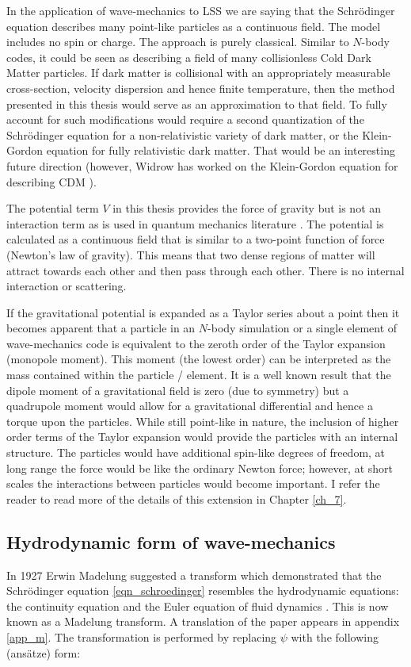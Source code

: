 In the application of wave-mechanics to LSS we are saying that the Schr\"odinger equation describes many point-like particles as a continuous field. The model includes no spin or charge. The approach is purely classical. Similar to $N$-body codes, it could be seen as describing a field of many collisionless Cold Dark Matter particles. If dark matter is collisional with an appropriately measurable cross-section, velocity dispersion and hence finite temperature, then the method presented in this thesis would serve as an approximation to that field. To fully account for such modifications would require a second quantization of the Schr\"odinger equation for a non-relativistic variety of dark matter, or the Klein-Gordon equation for fully relativistic dark matter. That would be an interesting future direction (however, Widrow has worked on the Klein-Gordon equation for describing CDM \citep{bib_wid}).

The potential term $V$ in this thesis provides the force of gravity but is not an interaction term as is used in quantum mechanics literature \citep{bib_val}. The potential is calculated as a continuous field that is similar to a two-point function of force (Newton's law of gravity). This means that two dense regions of matter will attract towards each other and then pass through each other. There is no internal interaction or scattering.

If the gravitational potential is expanded as a Taylor series about a point then it becomes apparent that a particle in an $N$-body simulation or a single element of wave-mechanics code is equivalent to the zeroth order of the Taylor expansion (monopole moment). This moment (the lowest order) can be interpreted as the mass contained within the particle / element. It is a well known result that the dipole moment of a gravitational field is zero (due to symmetry) but a quadrupole moment would allow for a gravitational differential and hence a torque upon the particles. While still point-like in nature, the inclusion of higher order terms of the Taylor expansion would provide the particles with an internal structure. The particles would have additional spin-like degrees of freedom, at long range the force would be like the ordinary Newton force; however, at short scales the interactions between particles would become important. I refer the reader to read more of the details of this extension in Chapter \ref{ch_7}.

\subsection{Hydrodynamic form of wave-mechanics}
\label{hydro}
In 1927 Erwin Madelung suggested a transform which demonstrated that the Schr\"odinger equation \ref{eqn_schroedinger} resembles the hydrodynamic equations: the continuity equation and the Euler equation of fluid dynamics \citep{bib_mad}. This is now known as a Madelung transform. A translation of the paper appears in appendix \ref{app_m}. The transformation is performed by replacing $\psi$ with the following (ans\"atze) form:

